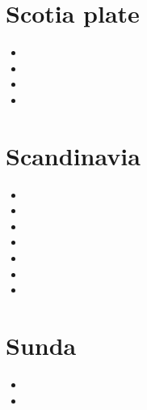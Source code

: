 
\section{Scotia plate}

\begin{small}
\begin{itemize}
\item[\twothousandthirteen]
\item[\twothousandtwenty]
\item[\twothousandtwentyone]
\item[\twothousandtwentythree]
\end{itemize}
\end{small}

\section{Scandinavia}

\begin{small}
\begin{itemize}
\item[\nineteeneighty] 
\item[\twothousandfive]
\item[\twothousandeight]
\item[\twothousandthirteen]
\item[\twothousandfourteen] 
\item[\twothousandfifteen] 
\item[\twothousand]
\end{itemize}
\end{small}

\section{Sunda}

\begin{small}
\begin{itemize}
\item[\twothousandeighteen]
\item[\twothousandtwentytwo]
\end{itemize}
\end{small}

